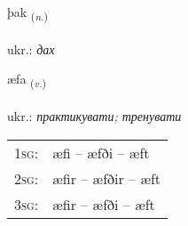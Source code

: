 \documentclass[frontgrid, backgrid]{flacards}\usepackage[]{graphicx}\usepackage[]{xcolor}
\begin{document}
{þak \small{\textsubscript{(\textit{n.})}} \\[1ex] %
\textphonetic{[θaːk]} \\
ukr.: \emph{дах} \\  [2ex]
\renewcommand*{\arraystretch}{0.8}
}

\renewcommand{\flhead}{\vskip5pt \fboxsep=0pt {\small\bfseries\footnotesize Sagnorð | дієслово}}
\renewcommand{\fcfoot}{\vskip5pt \fboxsep=0pt \hspace{2pt}{\small\bfseries\footnotesize 2K}}

\renewcommand{\blhead}{\vskip5pt {\small\bfseries\footnotesize Sagnorð | дієслово }}
\renewcommand{\bcfoot}{\vskip5pt \hspace{2pt}{\small\bfseries\footnotesize 2K}}


{æfa \small{\textsubscript{(\textit{v.})}} \\[1ex] %
\textphonetic{[aiːva]} \\
ukr.: \emph{практикувати; тренувати} \\  [2ex]
\renewcommand*{\arraystretch}{0.8}
\begin{tabular}{p{1cm}l}
\textsc{1sg}: & æfi -- æfði -- æft \\ 
\textsc{2sg}: & æfir -- æfðir -- æft \\ 
\textsc{3sg}: & æfir -- æfði -- æft \\ 
\end{tabular}
}

\renewcommand{\flhead}{\vskip5pt \fboxsep=0pt {\small\bfseries\footnotesize Nafnorð | іменник}}
\renewcommand{\fcfoot}{\vskip5pt \fboxsep=0pt \hspace{2pt}{\small\bfseries\footnotesize 2K}}

\renewcommand{\blhead}{\vskip5pt {\small\bfseries\footnotesize Nafnorð | іменник }}
\renewcommand{\bcfoot}{\vskip5pt \hspace{2pt}{\small\bfseries\footnotesize 2K}}
\end{document}
